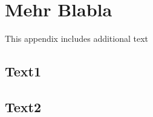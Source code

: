 \chapter{Mehr Blabla}\label{appendix:A}
This appendix includes additional text

\section{Text1}
\blindtext

\section{Text2}
\blindtext

